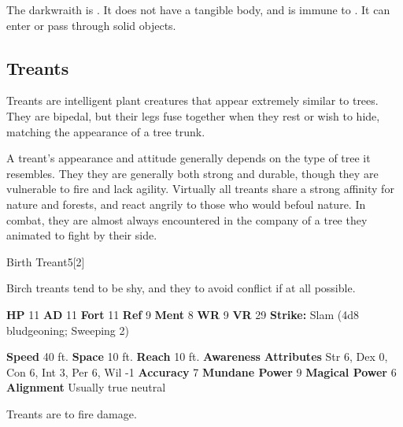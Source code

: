       The darkwraith is .
      It does not have a tangible body, and is immune to .
      It can enter or pass through solid objects.
  
    \subsection{Treants}
      
    Treants are intelligent plant creatures that appear extremely similar to trees.
    They are bipedal, but their legs fuse together when they rest or wish to hide, matching the appearance of a tree trunk.

    A treant's appearance and attitude generally depends on the type of tree it resembles.
    They they are generally both strong and durable, though they are vulnerable to fire and lack agility.
    Virtually all treants share a strong affinity for nature and forests, and react angrily to those who would befoul nature.
    In combat, they are almost always encountered in the company of a tree they animated to fight by their side.
  

      

      
  \begin{monsubsection}{Birth Treant}{5}[2]
    \vspace{-1em}\vspace{-1em}
    \vspace{0em}

    
        Birch treants tend to be shy, and they to avoid conflict if at all possible.
      
    

    \begin{spellcontent}
      \begin{spelltargetinginfo}
        \pari \textbf{HP} 11 \monsep
          \textbf{AD} 11 \monsep
          \textbf{Fort} 11 \monsep
          \textbf{Ref} 9 \monsep
          \textbf{Ment} 8
        \pari \textbf{WR} 9 \monsep
        \textbf{VR} 29
        \pari \textbf{Strike:}
            Slam  (4d8 bludgeoning; Sweeping 2)
      \end{spelltargetinginfo}
    \end{spellcontent}
    \begin{monsterfooter}
      \pari \textbf{Speed} 40 ft. \monsep
        \textbf{Space} 10 ft. \monsep
        \textbf{Reach} 10 ft.
      \pari \textbf{Awareness} 
      \pari \textbf{Attributes}
        Str 6, Dex 0,
        Con 6, Int 3,
        Per 6, Wil -1
      \pari \textbf{Accuracy} 7 \monsep
        \textbf{Mundane Power} 9 \monsep
      \textbf{Magical Power} 6
      \pari \textbf{Alignment} Usually true neutral
    \end{monsterfooter}
  \end{monsubsection}
        Treants are  to fire damage.
      
